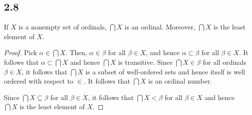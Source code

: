\subsection*{2.8} If $X$ is a nonempty set of ordinals, $\bigcap X$ is an ordinal. Moreover, $\bigcap X$ is the least element of $X$.

\begin{proof}
    Pick $\alpha \in \bigcap X$. Then, $\alpha \in \beta$ for all $\beta \in X$, and hence $\alpha \subset \beta$ for all $\beta \in X$. It follows that $\alpha \subset \bigcap X$ and hence $\bigcap X$ is transitive. Since $\bigcap X \in \beta$ for all ordinals $\beta \in X$, it follows that $\bigcap X$ is a subset of well-ordered sets and hence itself is well ordered with respect to $\in$. It follows that $\bigcap X$ is an ordinal number.
    
    Since $\bigcap X \subseteq \beta$ for all $\beta \in X$, it follows that $\bigcap X < \beta$ for all $\beta \in X$ and hence $\bigcap X$ is the least element of $X$.

    
\end{proof}


